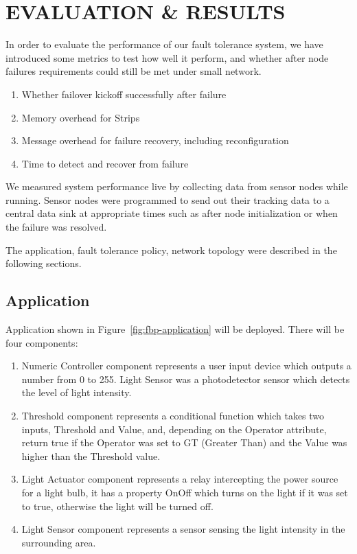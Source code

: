 \cleardoublepage
\singlespacing
\chapter{EVALUATION \& RESULTS}
\label{c:evaluation}
\doublespacing\nointerlineskip


In order to evaluate the performance of our fault tolerance system, we have
introduced some metrics to test how well it perform, and whether after node
failures requirements could still be met under small network.

\begin{enumerate}
\item Whether failover kickoff successfully after failure
\item Memory overhead for Strips
\item Message overhead for failure recovery, including reconfiguration
\item Time to detect and recover from failure
\end{enumerate}

We measured system performance live by collecting data from sensor nodes while
running. Sensor nodes were programmed to send out their tracking data to
a central data sink at appropriate times such as after node initialization or
when the failure was resolved.

The application, fault tolerance policy, network topology were described in the
following sections.


\section{Application}

Application shown in Figure~\ref{fig:fbp-application} will be deployed.  There
will be four components: 

\begin{enumerate}
\item Numeric Controller component represents a user input device which outputs
a number from 0 to 255. Light Sensor was a photodetector sensor which detects the
level of light intensity. 
\item Threshold component represents a conditional function which takes two
inputs, Threshold and Value, and, depending on the Operator attribute, return
true if the Operator was set to GT (Greater Than) and the Value was higher than
the Threshold value.
\item Light Actuator component represents a relay intercepting the power source for
a light bulb, it has a property OnOff which turns on the light if it was set to
true, otherwise the light will be turned off.
\item Light Sensor component represents a sensor sensing the light intensity in the surrounding
  area.
\end{enumerate}


